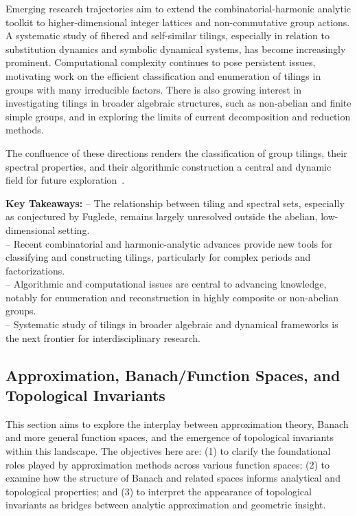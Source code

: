 \documentclass[sigconf]{acmart}
\begin{document}
Emerging research trajectories aim to extend the combinatorial-harmonic analytic toolkit to higher-dimensional integer lattices and non-commutative group actions. A systematic study of fibered and self-similar tilings, especially in relation to substitution dynamics and symbolic dynamical systems, has become increasingly prominent. Computational complexity continues to pose persistent issues, motivating work on the efficient classification and enumeration of tilings in groups with many irreducible factors. There is also growing interest in investigating tilings in broader algebraic structures, such as non-abelian and finite simple groups, and in exploring the limits of current decomposition and reduction methods.

The confluence of these directions renders the classification of group tilings, their spectral properties, and their algorithmic construction a central and dynamic field for future exploration~\cite{ref101}.

\vspace{0.5em}
\noindent
\textbf{Key Takeaways:}
\newline
-- The relationship between tiling and spectral sets, especially as conjectured by Fuglede, remains largely unresolved outside the abelian, low-dimensional setting.\\
-- Recent combinatorial and harmonic-analytic advances provide new tools for classifying and constructing tilings, particularly for complex periods and factorizations.\\
-- Algorithmic and computational issues are central to advancing knowledge, notably for enumeration and reconstruction in highly composite or non-abelian groups.\\
-- Systematic study of tilings in broader algebraic and dynamical frameworks is the next frontier for interdisciplinary research.

\subsection{Approximation, Banach/Function Spaces, and Topological Invariants}

This section aims to explore the interplay between approximation theory, Banach and more general function spaces, and the emergence of topological invariants within this landscape. The objectives here are: (1) to clarify the foundational roles played by approximation methods across various function spaces; (2) to examine how the structure of Banach and related spaces informs analytical and topological properties; and (3) to interpret the appearance of topological invariants as bridges between analytic approximation and geometric insight.
\end{document}
